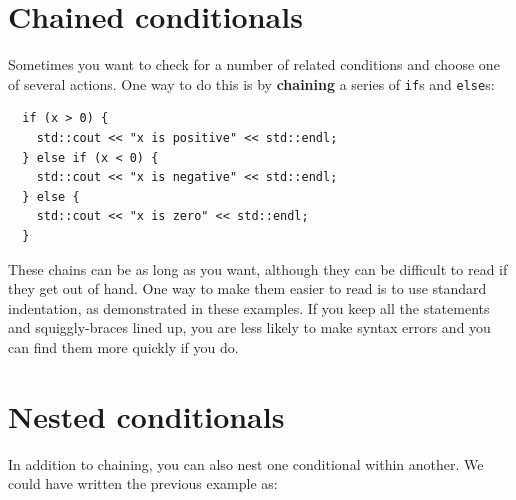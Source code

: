 \section {Chained conditionals}

Sometimes you want to check for a number of related conditions
and choose one of several actions.  One way to do this is by
{\bf chaining} a series of {\tt if}s and {\tt else}s:

\begin{lstlisting}
  if (x > 0) {
    std::cout << "x is positive" << std::endl;
  } else if (x < 0) {
    std::cout << "x is negative" << std::endl;
  } else {
    std::cout << "x is zero" << std::endl;
  }
\end{lstlisting}
%
These chains can be as long as you want, although they can
be difficult to read if they get out of hand.  One way to
make them easier to read is to use standard indentation,
as demonstrated in these examples.  If you keep all the
statements and squiggly-braces lined up, you are less
likely to make syntax errors and you can find them more
quickly if you do.

\section{Nested conditionals}

In addition to chaining, you can also nest one conditional
within another.  We could have written the previous example
as:

